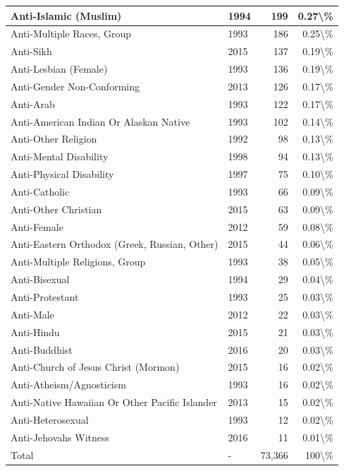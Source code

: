 \documentclass[
]{krantz}
\begin{document}
\begin{longtable}[t]{l|l|r|r}
\hline
Anti-Islamic (Muslim) & 1994 & 199 & 0.27\textbackslash{}\%\\
\hline
Anti-Multiple Races, Group & 1993 & 186 & 0.25\textbackslash{}\%\\
\hline
Anti-Sikh & 2015 & 137 & 0.19\textbackslash{}\%\\
\hline
Anti-Lesbian (Female) & 1993 & 136 & 0.19\textbackslash{}\%\\
\hline
Anti-Gender Non-Conforming & 2013 & 126 & 0.17\textbackslash{}\%\\
\hline
Anti-Arab & 1993 & 122 & 0.17\textbackslash{}\%\\
\hline
Anti-American Indian Or Alaskan Native & 1993 & 102 & 0.14\textbackslash{}\%\\
\hline
Anti-Other Religion & 1992 & 98 & 0.13\textbackslash{}\%\\
\hline
Anti-Mental Disability & 1998 & 94 & 0.13\textbackslash{}\%\\
\hline
Anti-Physical Disability & 1997 & 75 & 0.10\textbackslash{}\%\\
\hline
Anti-Catholic & 1993 & 66 & 0.09\textbackslash{}\%\\
\hline
Anti-Other Christian & 2015 & 63 & 0.09\textbackslash{}\%\\
\hline
Anti-Female & 2012 & 59 & 0.08\textbackslash{}\%\\
\hline
Anti-Eastern Orthodox (Greek, Russian, Other) & 2015 & 44 & 0.06\textbackslash{}\%\\
\hline
Anti-Multiple Religions, Group & 1993 & 38 & 0.05\textbackslash{}\%\\
\hline
Anti-Bisexual & 1994 & 29 & 0.04\textbackslash{}\%\\
\hline
Anti-Protestant & 1993 & 25 & 0.03\textbackslash{}\%\\
\hline
Anti-Male & 2012 & 22 & 0.03\textbackslash{}\%\\
\hline
Anti-Hindu & 2015 & 21 & 0.03\textbackslash{}\%\\
\hline
Anti-Buddhist & 2016 & 20 & 0.03\textbackslash{}\%\\
\hline
Anti-Church of Jesus Christ (Mormon) & 2015 & 16 & 0.02\textbackslash{}\%\\
\hline
Anti-Atheism/Agnosticism & 1993 & 16 & 0.02\textbackslash{}\%\\
\hline
Anti-Native Hawaiian Or Other Pacific Islander & 2013 & 15 & 0.02\textbackslash{}\%\\
\hline
Anti-Heterosexual & 1993 & 12 & 0.02\textbackslash{}\%\\
\hline
Anti-Jehovahs Witness & 2016 & 11 & 0.01\textbackslash{}\%\\
\hline
Total & - & 73,366 & 100\textbackslash{}\%\\
\hline
\end{longtable}
\end{document}
